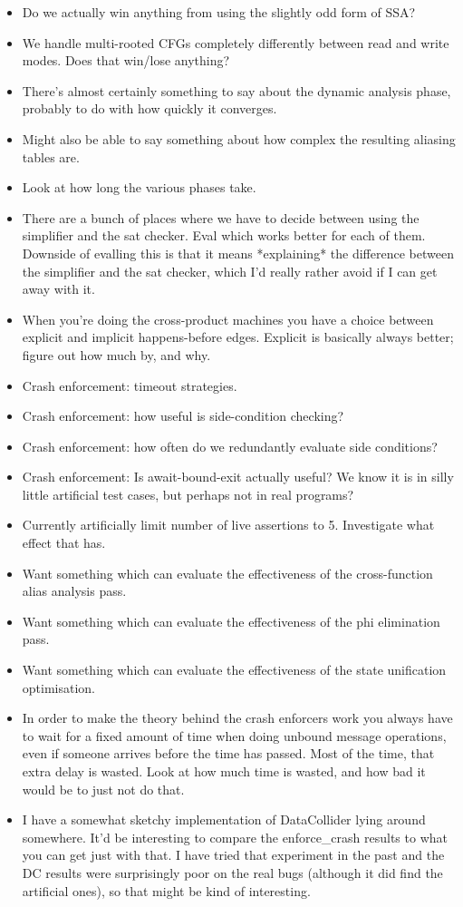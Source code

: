 \begin{itemize}
\item
  Do we actually win anything from using the slightly odd form of SSA?
\item
  We handle multi-rooted CFGs completely differently between read and write modes.
  Does that win/lose anything?
\item
  There's almost certainly something to say about the dynamic analysis phase, probably to do with how quickly it converges.
\item
  Might also be able to say something about how complex the resulting aliasing tables are.
\item
  Look at how long the various phases take.
\item
  There are a bunch of places where we have to decide between using
  the simplifier and the sat checker.  Eval which works better for
  each of them.  Downside of evalling this is that it means
  *explaining* the difference between the simplifier and the sat
  checker, which I'd really rather avoid if I can get away with it.
\item
  When you're doing the cross-product machines you have a choice
  between explicit and implicit happens-before edges.  Explicit is
  basically always better; figure out how much by, and why.
\item
  Crash enforcement: timeout strategies.
\item
  Crash enforcement: how useful is side-condition checking?
\item
  Crash enforcement: how often do we redundantly evaluate side conditions?
\item
  Crash enforcement: Is await-bound-exit actually useful?
  We know it is in silly little artificial test cases, but perhaps not in real programs?
\item
  Currently artificially limit number of live assertions to 5.
  Investigate what effect that has.
\item
  Want something which can evaluate the effectiveness of the
  cross-function alias analysis pass.
\item
  Want something which can evaluate the effectiveness of the phi
  elimination pass.
\item
  Want something which can evaluate the effectiveness of the state
  unification optimisation.
\item
  In order to make the theory behind the crash enforcers work you
  always have to wait for a fixed amount of time when doing unbound
  message operations, even if someone arrives before the time has
  passed.  Most of the time, that extra delay is wasted.  Look at how
  much time is wasted, and how bad it would be to just not do that.
\item
  I have a somewhat sketchy implementation of DataCollider lying
  around somewhere.  It'd be interesting to compare the enforce\_crash
  results to what you can get just with that.  I have tried that
  experiment in the past and the DC results were surprisingly poor on
  the real bugs (although it did find the artificial ones), so that
  might be kind of interesting.
\end{itemize}

